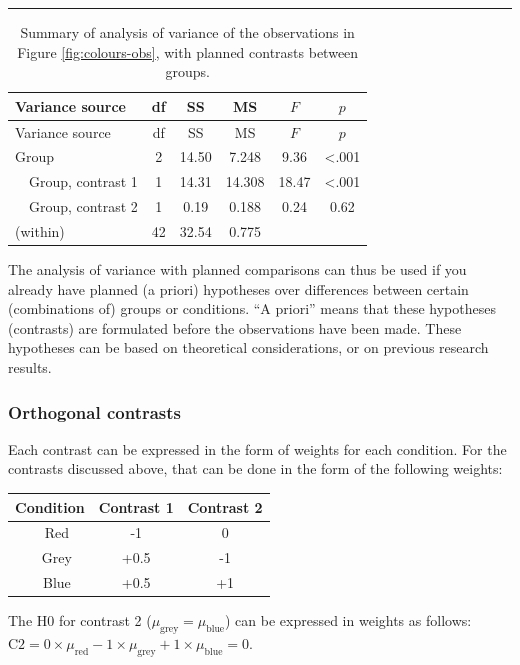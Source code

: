 \documentclass[
]{book}
\begin{document}
\begin{center}\rule{0.5\linewidth}{0.5pt}\end{center}

\begin{longtable}[]{@{}lccccc@{}}
\caption{\label{tab:colours-anova-contrast} Summary of analysis of variance of the observations in Figure \ref{fig:colours-obs}, with planned contrasts between groups.}\tabularnewline
\toprule
Variance source & df & SS & MS & \(F\) & \(p\) \\
\midrule
\endfirsthead
\toprule
Variance source & df & SS & MS & \(F\) & \(p\) \\
\midrule
\endhead
Group & 2 & 14.50 & 7.248 & 9.36 & \textless.001 \\
~~Group, contrast 1 & 1 & 14.31 & 14.308 & 18.47 & \textless.001 \\
~~Group, contrast 2 & 1 & 0.19 & 0.188 & 0.24 & 0.62 \\
(within) & 42 & 32.54 & 0.775 & & \\
\bottomrule
\end{longtable}

The analysis of variance with planned comparisons can thus be used
if you already have planned (a priori) hypotheses over differences between
certain (combinations of) groups or conditions. ``A priori'' means that these
hypotheses (contrasts) are formulated before the observations have been made.
These hypotheses can be based on theoretical considerations, or on
previous research results.

\hypertarget{orthogonal-contrasts}{%
\subsubsection{Orthogonal contrasts}\label{orthogonal-contrasts}}

Each contrast can be expressed in the form of weights for each
condition. For the contrasts discussed above, that can be done
in the form of the following weights:

\begin{longtable}[]{@{}ccc@{}}
\toprule
Condition & Contrast 1 & Contrast 2 \\
\midrule
\endhead
~~Red & -1 & 0 \\
~~Grey & +0.5 & -1 \\
~~Blue & +0.5 & +1 \\
\bottomrule
\end{longtable}

The H0 for contrast 2 (\(\mu_\textrm{grey} = \mu_\textrm{blue}\)) can be
expressed in weights as follows:
\(\textrm{C2} = 0\times \mu_\textrm{red} -1 \times \mu_\textrm{grey} +1 \times \mu_\textrm{blue} = 0\).
\end{document}
